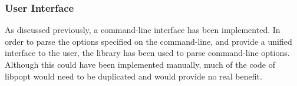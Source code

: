 \subsubsection{User Interface}
As discussed previously, a command-line interface has been implemented. In order to parse the options specified on the command-line, and provide a unified interface to the user, the  library has been used to parse command-line options. Although this could have been implemented manually, much of the code of libpopt would need to be duplicated and would provide no real benefit.
\begin{comment}
	\begin{itemize}
		\item Give background on libraries used and what they are used for
		\item Give alternatives to some libraries and explain why they weren't used (Marsyas and MAAATE)
		\begin{itemize}
			\item lack of knowledge of libraries - would have taken as long to learn it as to have written it myself
			\item too big to leverage into the proof-of-concept example needed
			\item wouldn't allow as much flexibility in operation of the program
			\item this way is easier to modify in future to add more extractors / build on in any way
			\item why they would have been good
			\begin{itemize}
				\item easier to chop and change between features (not important for my project)
				\item ?
			\end{itemize}
		\end{itemize}
		\item GStreamer (vs. libmad, libogg/vorbis, libflac; directsound)
		\item libsndfile
		\item FFTW3 (vs. hand coded - OMG)
		\item libpopt (vs. hand coded - just lazy)
	\end{itemize}
\end{comment}
